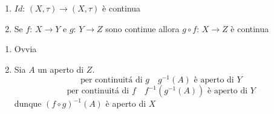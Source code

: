 \begin{thm}\bbianco
\begin{enumerate}
	\item $Id:\, (X,\tau)\to (X,\tau)$ \`e continua
	\item Se $f:\, X\to Y $ e $g:\, Y \to Z $ sono continue allora $ g\circ f :\, X \to Z $ \`e continua
\end{enumerate}
\proof\bbianco
\begin{enumerate}
	\item Ovvia
	\item Sia $A$ un aperto di $Z$.
	$$ \text{ per continuit\'a di } g \quad g^{-1}(A) \text{ \`e aperto di } Y $$
	$$ \text{ per continuit\'a di } f \quad f^{-1}\left( g^{-1}(A)  \right) \text{ \`e aperto di } Y $$
	dunque $(f\circ g)^{-1}(A)$ \`e aperto di $X$
\end{enumerate}
\endproof
\end{thm}
